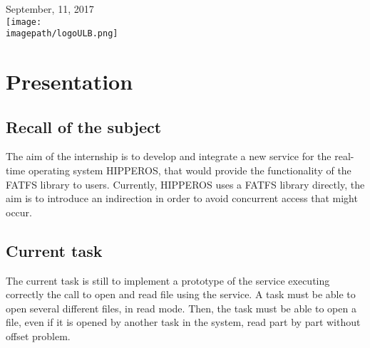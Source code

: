 \documentclass[12pt]{article}
\begin{document}
\begin{titlepage}

{\large September, 11, 2017 }\\[2cm] %



\texttt{[image: \\imagepath/logoULB.png]}\\[1cm] 
 

\vfill %

\end{titlepage}

\newpage


\pagestyle{fancy}
\fancyhf{}
\setlength\headheight{15pt}
\fancyhead[R]{}
\fancyfoot[L]{\today}
\fancyfoot[R]{\thepage}

\newpage

\section{Presentation}
\subsection{Recall of the subject}
The aim of the internship is to develop and integrate a new service for the real-time operating system HIPPEROS, 
that would provide the functionality of the FATFS library to users.
Currently, HIPPEROS uses a FATFS library directly, the aim is to introduce an indirection in order to 
avoid concurrent access that might occur.

\subsection{Current task}
The current task is still to implement a prototype of the service 
executing correctly the call to open and read file using the service. 
A task must be able to open several different files, in read mode.
Then, the task must be able to open a file, even if it is opened 
by another task in the system, read part by part without offset problem.
\end{document}
